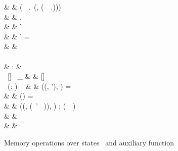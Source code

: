 \begin{figure}[H]
\begin{functioncode}
{                                                                    &               &   \quad \quad \quad ( \ \Statevar.\Restrictstatemember \ (\Simplelocvar, (\filterinactive \ \Basesvar \ \Statevar.\Scopesstatemember)))\errbind \\
                                                                    &               &   \quad \quad \pseudoelse \Statevar.\Restrictstatemember \\
                                                                    &               &   \quad \pseudoin \Statevar' \\ 
                                                                    &               &   \quad \quad \quad \pseudowhere \Statevar' = \Statevar \pseudowith [ \\
                                                                    &               &   \quad \quad \quad \quad \Memstatemember := (\textcode{deallocate} \ \Statevar.\Memstatemember \ (\textcode{block} \ \Simplelocvar)),\\
                                                                    &               &   \quad \quad \quad \quad \Restrictstatemember := R \\ 
                                                                    &               &   \quad \quad \quad ] \\
                                                                    &               &   \pseudoelse \nonesym \\~\\
\filterinactive                                                     &   :           &   \Bases \to \Scopemap \to \Bases \\
\filterinactive \ [] \ \_                                           & \triangleq    &   [] \\
\filterinactive \ (\Basevar : \Basesvar) \ \Scopemapvar
                                                                    & \triangleq    &   \pseudolet ((\Simplelocvar, \Basesvar'), \Scopeidvar) = \Basevar \ \pseudoin \\
                                                                    &               &   \quad \pseudoif \Scopemapvar(\Scopeidvar) = \true \ \pseudothen \\
                                                                    &               &   \quad \quad ((\Simplelocvar, (\filterinactive \ \Basesvar' \ \Scopemapvar)), \Scopeidvar) : (\filterinactive \ \Basesvar \ \Scopemapvar) \\
                                                                    &               &   \quad \pseudoelse \\ 
                                                                    &               &   \quad \quad \filterinactive \ \Basesvar \ \Scopemapvar 
}
\end{functioncode}
\caption{Memory operations over states \Statevar \ and auxiliary function \textcode{\filterinactive}}
\label{figure:mem-operations}
\end{figure}
    
